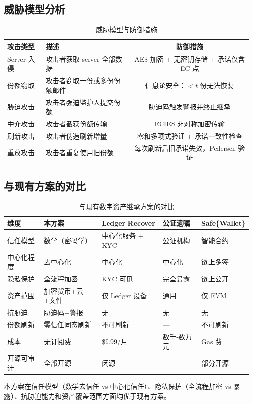 \subsection{威胁模型分析}

\begin{table}[H]
    \centering
    \caption{威胁模型与防御措施}
    \label{tab:threats}
    \begin{tabularx}{\textwidth}{lXc}
        \toprule
        \textbf{攻击类型} & \textbf{描述} & \textbf{防御措施} \\
        \midrule
        Server 入侵 & 攻击者获取 server 全部数据 & AES 加密 + 无密钥存储 + 承诺仅含 EC 点 \\
        \midrule
        份额窃取 & 攻击者窃取一份或多份份额邮件 & 信息论安全：$< t$ 份无法恢复 \\
        \midrule
        胁迫攻击 & 攻击者强迫监护人提交份额 & 胁迫码触发警报并终止继承 \\
        \midrule
        中介攻击 & 攻击者截获份额传输 & ECIES 非对称加密传输 \\
        \midrule
        刷新攻击 & 攻击者伪造刷新增量 & 零和多项式验证 + 承诺一致性检查 \\
        \midrule
        重放攻击 & 攻击者重复使用旧份额 & 每次刷新后旧承诺失效，Pedersen 验证 \\
        \bottomrule
    \end{tabularx}
\end{table}

\subsection{与现有方案的对比}

\begin{table}[H]
    \centering
    \caption{与现有数字资产继承方案的对比}
    \label{tab:comparison}
    \begin{tabularx}{\textwidth}{lXXXX}
        \toprule
        \textbf{维度} & \textbf{本方案} & \textbf{Ledger Recover} & \textbf{公证遗嘱} & \textbf{Safe\{Wallet\}} \\
        \midrule
        信任模型 & 数学（密码学） & 中心化服务 + KYC & 公证机构 & 智能合约 \\
        中心化程度 & 去中心化 & 中心化 & 中心化 & 链上多签 \\
        隐私保护 & 全流程加密 & KYC 可见 & 完全暴露 & 链上公开 \\
        资产范围 & 加密货币+云+文件 & 仅 Ledger 设备 & 通用 & 仅 EVM \\
        抗胁迫 & 胁迫码+警报 & 无 & 无 & 无 \\
        份额刷新 & 零信任同态刷新 & 不可刷新 & — & 不可刷新 \\
        成本 & 无订阅费 & \$9.99/月 & 数千-数万元 & Gas 费 \\
        开源可审计 & 全部开源 & 闭源 & — & 部分开源 \\
        \bottomrule
    \end{tabularx}
\end{table}

本方案在信任模型（数学去信任 vs 中心化信任）、隐私保护（全流程加密 vs 暴露）、抗胁迫能力和资产覆盖范围方面均优于现有方案。
